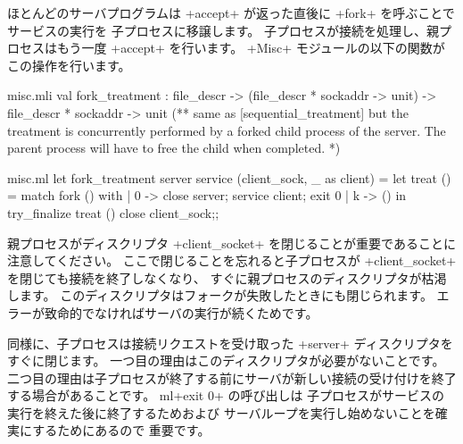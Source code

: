 ほとんどのサーバプログラムは \ml+accept+ が返った直後に \ml+fork+ を呼ぶことでサービスの実行を
子プロセスに移譲します。
子プロセスが接続を処理し、親プロセスはもう一度 \ml+accept+ を行います。
\ml+Misc+ モジュールの以下の関数がこの操作を行います。
%
\begin{codefile}{misc.mli}
val fork_treatment :
 file_descr -> (file_descr * sockaddr -> unit) ->
 file_descr * sockaddr -> unit
(** same as [sequential_treatment] but the treatment is concurrently
 performed by a forked child process of the server. The parent process
 will have to free the child when completed. *)
\end{codefile}
%
\begin{listingcodefile}{misc.ml}
let fork_treatment server service (client_sock, _ as client) =
  let treat () = match fork () with
    | 0 -> close server; service client; exit 0
    | k -> ()
  in
  try_finalize treat () close client_sock;;
\end{listingcodefile}
%
親プロセスがディスクリプタ \ml+client_socket+ を閉じることが重要であることに注意してください。
ここで閉じることを忘れると子プロセスが \ml+client_socket+ を閉じても接続を終了しなくなり、
すぐに親プロセスのディスクリプタが枯渇します。
このディスクリプタはフォークが失敗したときにも閉じられます。
エラーが致命的でなければサーバの実行が続くためです。

同様に、子プロセスは接続リクエストを受け取った \ml+server+ ディスクリプタをすぐに閉じます。
一つ目の理由はこのディスクリプタが必要がないことです。
二つ目の理由は子プロセスが終了する前にサーバが新しい接続の受け付けを終了する場合があることです。
ml+exit 0+ の呼び出しは
子プロセスがサービスの実行を終えた後に終了するためおよび
サーバループを実行し始めないことを確実にするためにあるので
重要です。

